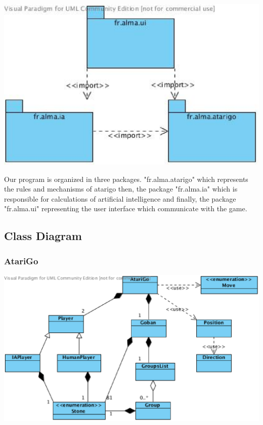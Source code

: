\documentclass[11pt,a4paper]{report}
\begin{document}
\begin{center}
	\includegraphics[scale=0.70]{package_diag}
\end{center}

    Our program is organized in three packages. "fr.alma.atarigo" which represents the rules and mechanisms of atarigo then, the package "fr.alma.ia" which is responsible for calculations of artificial intelligence and finally, the package "fr.alma.ui" representing the user interface which communicate with the game.

\subsection*{Class Diagram}


\subsubsection*{AtariGo}


\begin{center}
	\includegraphics[scale=0.70]{class_diag}
\end{center}
\end{document}
